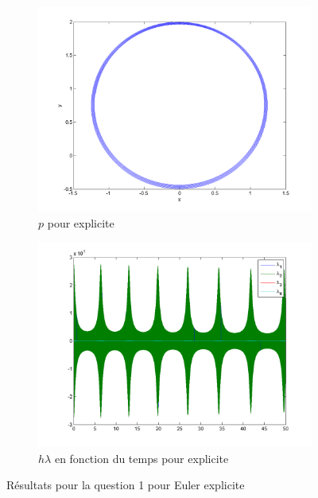 \begin{figure}[!ht]
\begin{subfigure}[b]{0.45\textwidth}
    \includegraphics[width=\textwidth]{images/Q1_explicite_p.png}
    \caption{$p$ pour explicite}
    \label{fig:q1_explicite_p}
  \end{subfigure}
  \begin{subfigure}[b]{0.45\textwidth}
    \includegraphics[width=\textwidth]{images/Q1_explicite_lambda.png}
    \caption{$h\lambda$ en fonction du temps pour explicite}
    \label{fig:q1_explicite_lambda}
  \end{subfigure}
  \caption{Résultats pour la question 1 pour Euler explicite}
  \label{fig:q1_exp}
\end{figure}

